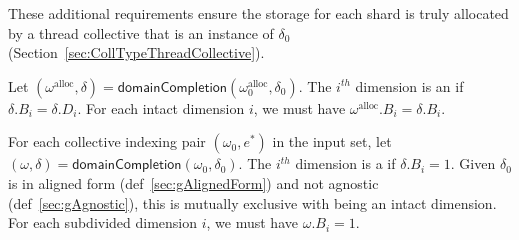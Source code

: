 
These additional requirements ensure the storage for each shard is truly allocated by a thread collective that is an instance of $\delta_0$ (Section~\ref{sec:CollTypeThreadCollective}).

 Let $(\omega^\text{alloc}, \delta) = \mathsf{domainCompletion}(\omega_0^\text{alloc}, \delta_0)$.
The $i^{th}$ dimension is an  if $\delta.B_i = \delta.D_i$.
For each intact dimension $i$, we must have $\omega^\text{alloc}.B_i = \delta.B_i$.

 For each collective indexing pair $(\omega_0, e^*)$ in the input set, let $(\omega, \delta) = \mathsf{domainCompletion}(\omega_0, \delta_0)$.
The $i^{th}$ dimension is a  if $\delta.B_i = 1$.
Given $\delta_0$ is in aligned form (def~\ref{sec:gAlignedForm}) and not agnostic (def~\ref{sec:gAgnostic}), this is mutually exclusive with being an intact dimension.
For each subdivided dimension $i$, we must have $\omega.B_i = 1$.
